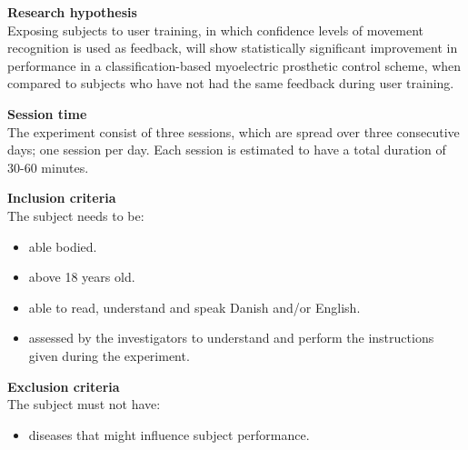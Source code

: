 
\textbf{Research hypothesis} \\
Exposing subjects to user training, in which confidence levels of movement recognition is used as feedback, will show statistically significant improvement in performance in a classification-based myoelectric prosthetic control scheme, when compared to subjects who have not had the same feedback during user training.%


\textbf{Session time} \\
The experiment consist of three sessions, which are spread over three consecutive days; one session per day. Each session is estimated to have a total duration of 30-60 minutes. 

\textbf{Inclusion criteria} \\
The subject needs to be:
\begin{itemize}
	\item able bodied.
	\item above 18 years old.
	\item able to read, understand and speak Danish and/or English.
	\item assessed by the investigators to understand and perform the instructions given during the experiment. 
\end{itemize}


\textbf{Exclusion criteria} \\
The subject must not have:
\begin{itemize}
	\item diseases that might influence subject performance. 
\end{itemize}


